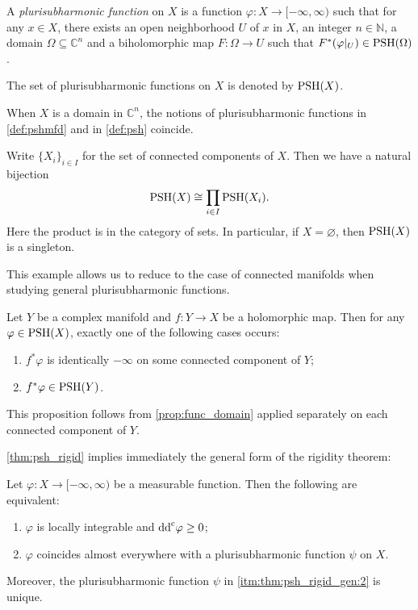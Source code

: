 \begin{definition}\label{def:pshmfd}
    A \emph{plurisubharmonic function} on $X$ is a function $\varphi\colon X\rightarrow [-\infty,\infty)$ such that for any $x\in X$, there exists an open neighborhood $U$ of $x$ in $X$, an integer $n\in \mathbb{N}$, a domain $\Omega\subseteq \mathbb{C}^n$ and a biholomorphic map $F\colon \Omega\rightarrow U$ such that $F^*(\varphi|_U)\in \mathrm{PSH}(\Omega)$.

    The set of plurisubharmonic functions on $X$ is denoted by $\mathrm{PSH}(X)$.
\end{definition}

\begin{example}\label{ex:pshfunctions:L172}
    When $X$ is a domain in $\mathbb{C}^n$, the notions of plurisubharmonic functions in \cref{def:pshmfd} and in \cref{def:psh} coincide.
\end{example}

\begin{example}\label{ex:pshfunctions:L176}
    Write $\{X_i\}_{i\in I}$ for the set of connected components of $X$. Then we have a natural bijection
    \[
    \mathrm{PSH}(X) \cong \prod_{i\in I} \mathrm{PSH}(X_i).
    \]
    Here the product is in the category of sets.
    In particular, if $X=\varnothing$, then $\mathrm{PSH}(X)$ is a singleton.
\end{example}
This example allows us to reduce to the case of connected manifolds when studying general plurisubharmonic functions.

\begin{proposition}\label{prop:pullbackpsh}
    Let $Y$ be a complex manifold and $f\colon Y\rightarrow X$ be a holomorphic map. Then for any $\varphi\in \mathrm{PSH}(X)$, exactly one of the following cases occurs:
    \begin{enumerate}
        \item\label{itm:prop:pullbackpsh:1} $f^*\varphi$ is identically $-\infty$ on some connected component of $Y$;
        \item\label{itm:prop:pullbackpsh:2} $f^*\varphi\in \mathrm{PSH}(Y)$.
    \end{enumerate}
\end{proposition}
This proposition follows from \cref{prop:func_domain} applied separately on each connected component of $Y$.

\cref{thm:psh_rigid} implies immediately the general form of the rigidity theorem:
\begin{theorem}\label{thm:psh_rigid_gen}
    Let $\varphi\colon X\rightarrow [-\infty,\infty)$ be a measurable function. Then the following are equivalent:
    \begin{enumerate}
        \item\label{itm:thm:psh_rigid_gen:1} $\varphi$ is locally integrable and $\mathrm{dd}^{\mathrm{c}} \varphi\geq 0$;
        \item\label{itm:thm:psh_rigid_gen:2} $\varphi$ coincides almost everywhere with a plurisubharmonic function $\psi$ on $X$.
    \end{enumerate}
    Moreover, the plurisubharmonic function $\psi$ in \ref{itm:thm:psh_rigid_gen:2} is unique.
\end{theorem}


